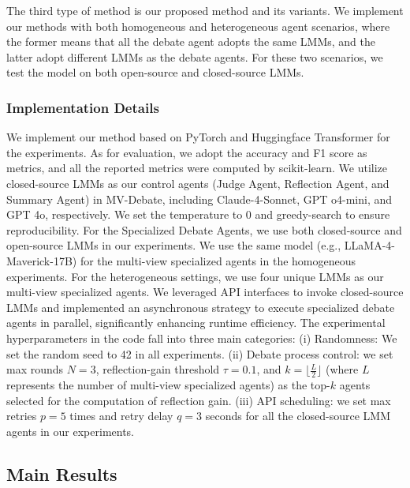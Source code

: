 \documentclass[letterpaper]{article} %
\begin{document}
The third type of method is our proposed method and its variants. We implement our methods with both homogeneous and heterogeneous agent scenarios, where the former means that all the debate agent adopts the same LMMs, and the latter adopt different LMMs as the debate agents. For these two scenarios, we test the model on both open-source and closed-source LMMs.  





\subsubsection{Implementation Details}


We implement our method based on PyTorch and Huggingface Transformer for the experiments. As for evaluation, we adopt the accuracy and F1 score
as metrics, and all the reported metrics were computed by scikit-learn.  
We utilize closed-source LMMs as our control agents (Judge Agent, Reflection Agent, and Summary Agent)  in MV-Debate, including Claude-4-Sonnet, GPT o4-mini, and GPT 4o, respectively. We set the temperature to 0 and greedy-search to ensure reproducibility. For the Specialized Debate Agents, we use both closed-source and open-source LMMs in our experiments. We use the same model (e.g.,  LLaMA-4-Maverick-17B) for the multi-view specialized agents in the homogeneous experiments. For the heterogeneous settings, we use four unique LMMs as our multi-view specialized agents. We leveraged API interfaces to invoke closed-source LMMs and implemented an asynchronous strategy to execute specialized debate agents in parallel, significantly enhancing runtime efficiency. The experimental hyperparameters in the code fall into three main categories: 
(i) Randomness: We set the random seed to 42 in all experiments. (ii) Debate process control: we set max rounds $N=3$, reflection-gain threshold $\tau=0.1$, and $ k = \lfloor \frac{L}{2} \rfloor$ (where $L$ represents the number of multi-view specialized agents) as the top-$k$ agents selected for the computation of reflection gain. (iii) API scheduling: we set max retries $p = 5 $ times and retry delay $q = 3$  seconds for all the closed-source LMM agents in our experiments.

\subsection{Main Results}
\end{document}
